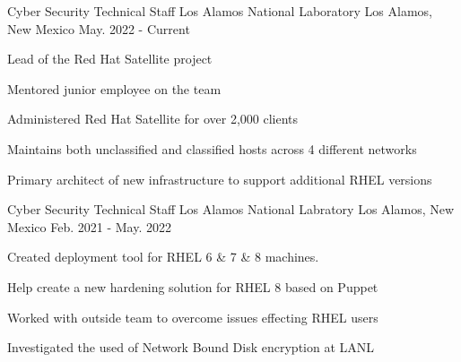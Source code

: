 

\begin{cventries}

  \cventry
    {Cyber Security Technical Staff} %
    {Los Alamos National Laboratory} %
    {Los Alamos, New Mexico} %
    {May. 2022 - Current} %
    {
      \begin{cvitems} %
        \item {Lead of the Red Hat Satellite project}
        \item {Mentored junior employee on the team}
        \item {Administered Red Hat Satellite for over 2,000 clients}
        \item {Maintains both unclassified and classified hosts across 4 different networks}
        \item {Primary architect of new infrastructure to support additional RHEL versions}
      \end{cvitems}
    }

  \cventry
    {Cyber Security Technical Staff} %
    {Los Alamos National Labratory} %
    {Los Alamos, New Mexico} %
    {Feb. 2021 - May. 2022} %
    {
      \begin{cvitems} %
        \item {Created deployment tool for RHEL 6 \& 7 \& 8 machines.}
        \item {Help create a new hardening solution for RHEL 8 based on Puppet}
        \item {Worked with outside team to overcome issues effecting RHEL users}
        \item {Investigated the used of Network Bound Disk encryption at LANL}
      \end{cvitems}
    }


\end{cventries}

